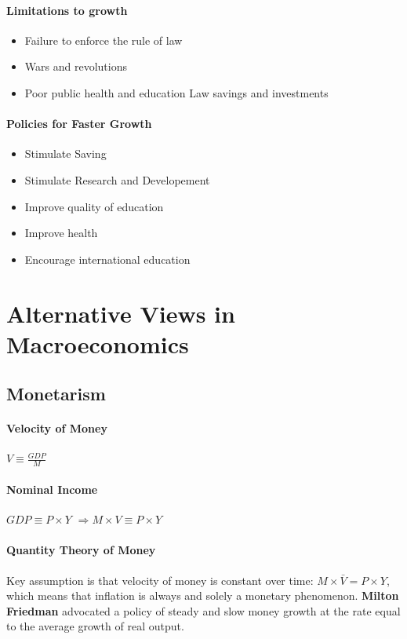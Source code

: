 \documentclass[11pt]{article}
\begin{document}
\paragraph{Limitations to growth}
\begin{itemize}
    \item Failure to enforce the rule of law
    \item Wars and revolutions
    \item Poor public health and education
    Law savings and investments
\end{itemize}

\paragraph{Policies for Faster Growth}
\begin{itemize}
    \item Stimulate Saving
    \item Stimulate Research and Developement
    \item Improve quality of education
    \item Improve health
    \item Encourage international education
\end{itemize}

\section{Alternative Views in Macroeconomics}
\subsection{Monetarism}
\paragraph{Velocity of Money}
$V \equiv \frac{GDP}{M}$
\paragraph{Nominal Income}
$GDP \equiv P \times Y$
$\Rightarrow  M \times V \equiv P \times Y$

\paragraph{Quantity Theory of Money}
Key assumption is that velocity of money is constant over time: $M \times \bar V = P \times Y$, which means that inflation is always and solely a monetary phenomenon. \textbf{Milton Friedman} advocated a policy of steady and slow money growth at the rate equal to the average growth of real output.
\end{document}

